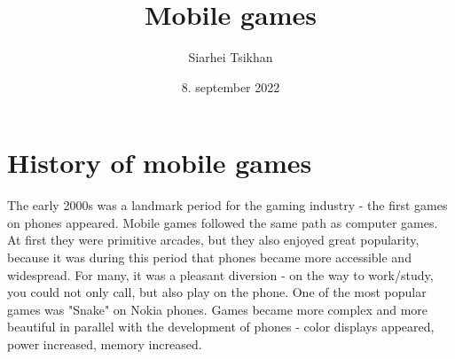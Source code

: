 \documentclass[10pt,oneside,a4paper]{article}
\begin{document}
\title{ Mobile games}
\author{Siarhei Tsikhan\\[2pt]}
\date{\small 8. september 2022}
\maketitle


\section*{History of mobile games}
The early 2000s was a landmark period for the gaming industry - the first games on phones appeared. Mobile games followed the same path as computer games. At first they were primitive arcades, but they also enjoyed great popularity, because it was during this period that phones became more accessible and widespread. For many, it was a pleasant diversion - on the way to work/study, you could not only call, but also play on the phone. One of the most popular games was "Snake" on Nokia phones. Games became more complex and more beautiful in parallel with the development of phones - color displays appeared, power increased, memory increased.\cite{Old}
\end{document}
